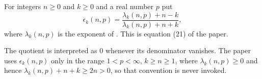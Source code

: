 \begin{definition}
For integers $n\ge0$ and $k\ge0$ and a real number $p$ put
\[
  \epsilon_k(n,p)=\frac{\lambda_k(n,p)+n-k}{\lambda_k(n,p)+n+k},
\]
where $\lambda_k(n,p)$ is the exponent of .  This is
equation (21) of the paper.

The quotient is interpreted as $0$ whenever its denominator vanishes.  The
paper uses $\epsilon_k(n,p)$ only in the range $1<p<\infty$, $k\ge n\ge1$,
where $\lambda_k(n,p)\ge0$ and hence $\lambda_k(n,p)+n+k\ge 2n>0$, so that
convention is never invoked.
\end{definition}

